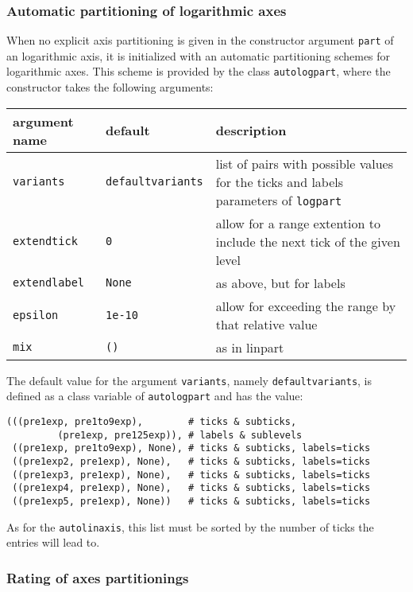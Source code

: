 \subsubsection{Automatic partitioning of logarithmic axes}

When no explicit axis partitioning is given in the constructor
argument \verb|part| of an logarithmic axis, it is initialized with an
automatic partitioning schemes for logarithmic axes. This scheme is
provided by the class \verb|autologpart|, where the constructor takes
the following arguments:

\medskip
\begin{tabularx}{\linewidth}{ll>{\raggedright\arraybackslash}X}
argument name&default&description\\
\hline
\texttt{variants}&\texttt{defaultvariants}&list of pairs with possible values for the ticks and labels parameters of \texttt{logpart}\\
\texttt{extendtick}&\texttt{0}&allow for a range extention to include the next tick of the given level\\
\texttt{extendlabel}&\texttt{None}&as above, but for labels\\
\texttt{epsilon}&\texttt{1e-10}&allow for exceeding the range by that relative value\\
\texttt{mix}&\texttt{()}&as in linpart\\
\end{tabularx}
\medskip

The default value for the argument \verb|variants|, namely
\verb|defaultvariants|, is defined as a class variable of
\verb|autologpart| and has the value:
\begin{verbatim}
(((pre1exp, pre1to9exp),        # ticks & subticks,
         (pre1exp, pre125exp)), # labels & sublevels
 ((pre1exp, pre1to9exp), None), # ticks & subticks, labels=ticks
 ((pre1exp2, pre1exp), None),   # ticks & subticks, labels=ticks
 ((pre1exp3, pre1exp), None),   # ticks & subticks, labels=ticks
 ((pre1exp4, pre1exp), None),   # ticks & subticks, labels=ticks
 ((pre1exp5, pre1exp), None))   # ticks & subticks, labels=ticks
\end{verbatim}
As for the \verb|autolinaxis|, this list must be sorted by the number
of ticks the entries will lead to.

\subsubsection{Rating of axes partitionings}

